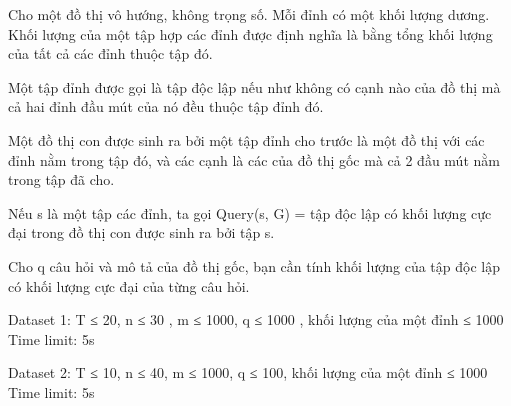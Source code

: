 Cho một đồ thị vô hướng, không trọng số. Mỗi đỉnh có một khối lượng dương. Khối lượng của một tập hợp các đỉnh được định nghĩa là bằng tổng khối lượng của tất cả các đỉnh thuộc tập đó.  

   Một tập đỉnh được gọi là tập độc lập nếu như không có cạnh nào của đồ thị mà cả hai đỉnh đầu mút của nó đều thuộc tập đỉnh đó.  

   Một đồ thị con được sinh ra bởi một tập đỉnh cho trước là một đồ thị với các đỉnh nằm trong tập đó, và các cạnh là các của đồ thị gốc mà cả 2 đầu mút nằm trong tập đã cho.  

   Nếu s là một tập các đỉnh, ta gọi Query(s, G) = tập độc lập có khối lượng cực đại trong đồ thị con được sinh ra bởi tập s.  

   Cho q câu hỏi và mô tả của đồ thị gốc, bạn cần tính khối lượng của tập độc lập có khối lượng cực đại của từng câu hỏi.  

Dataset 1: T ≤ 20, n ≤ 30 , m ≤ 1000, q ≤ 1000 , khối lượng của một đỉnh ≤ 1000 Time limit: 5s  

   Dataset 2: T ≤ 10, n ≤ 40, m ≤ 1000, q ≤ 100, khối lượng của một đỉnh ≤ 1000 Time limit: 5s